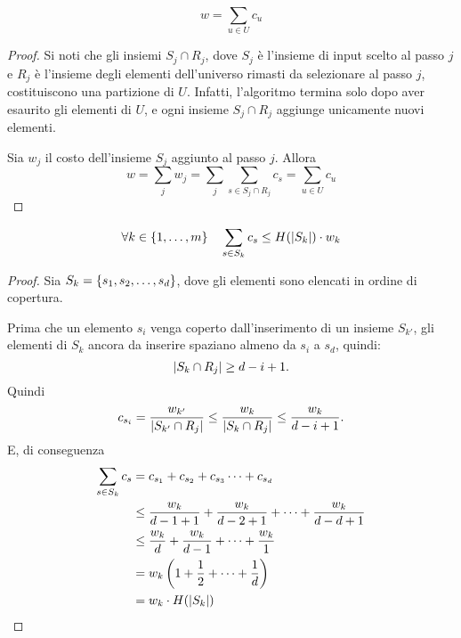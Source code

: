 \begin{lemma}\label{lem:gsetcov_w_sum_c_u}
	\begin{equation*}
		w=\sum_{u\in U} c_u
	\end{equation*}
\end{lemma}
\begin{proof}
	Si noti che gli insiemi $S_j\cap R_j$, dove $S_j$ è l'insieme di input scelto al passo $j$ e $R_j$ è l'insieme degli elementi dell'universo rimasti da selezionare al passo $j$, costituiscono una partizione di $U$. Infatti, l'algoritmo termina solo dopo aver esaurito gli elementi di $U$, e ogni insieme $S_j\cap R_j$ aggiunge unicamente nuovi elementi.

	Sia $w_j$ il costo dell'insieme $S_j$ aggiunto al passo $j$. Allora
	\begin{equation*}
		w = \sum_j w_j=\sum_j\sum_{s\in S_j\cap R_j} c_s=\sum_{u\in U} c_u
	\end{equation*}
\end{proof}
\begin{lemma}\label{lem:gsetcov_cu_leq_harmoskwk}
	\begin{equation*}
		\forall k\in\left\{ 1,\dots,m \right\} \quad\sum_{s\in S_k} c_s\leq H(| S_k |) \cdot w_k
	\end{equation*}
\end{lemma}
\begin{proof}
	Sia $S_k=\left\{ s_1,s_2,\dots,s_d \right\}$, dove gli elementi sono elencati in ordine di copertura.

	Prima che un elemento $s_i$ venga coperto dall'inserimento di un insieme $S_{k'}$, gli elementi di $S_k$ ancora da inserire spaziano almeno da $s_i$ a $s_d$, quindi:
	\begin{equation*}
		| S_k\cap R_j |\geq d-i+1 \text.
	\end{equation*}
	Quindi
	\begin{equation*}
		c_{s_i}=\frac{w_{k'}}{| S_{k'}\cap R_j |}
		\leq\frac{w_k}{| S_k\cap R_j |}
		\leq\frac{w_k}{d-i+1} \text.
	\end{equation*}
	E, di conseguenza
	\begin{align*}
		\sum_{s\in S_k} c_s & =c_{s_1}+c_{s_2}+c_{s_3}\dots+c_{s_d}                            \\
		                    & \leq \frac{w_k}{d-1+1}+\frac{w_k}{d-2+1}+\dots+\frac{w_k}{d-d+1} \\
		                    & \leq \frac{w_k}{d}+\frac{w_k}{d-1}+\dots+\frac{w_k}{1}           \\
		                    & = w_k\left(1 + \frac{1}{2} + \dots + \frac{1}{d}\right)          \\
		                    & = w_k\cdot H(| S_k |)
	\end{align*}
\end{proof}

